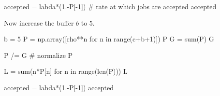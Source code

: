 \begin{exercise}
\begin{solution}
\begin{pyconsole}
accepted = labda*(1.-P[-1]) # rate at which jobs are accepted
accepted
\end{pyconsole}  

Now increase the buffer $b$ to 5.

\begin{pyconsole}
b = 5
P = np.array([rho**n for n in range(c+b+1)])
P
G = sum(P)
G

P /= G # normalize
P

L = sum(n*P[n] for n in range(len(P)))
L

accepted = labda*(1.-P[-1])
accepted
\end{pyconsole}      
    \end{solution}
\end{exercise}

\begin{comment}
\begin{exercise}[use=false]
  The code is in \pyv{progs/mm1\_waiting\_time_distribution.py}. In
this program we compute the waiting time
  distribution. At this point in the text this distribution has not
  yet been derived.  This problem should be moved to another section.

Consider an $M/M/1$ queue with $\mu=1.2$ per hour. Make plots of the
waiting time distribution $\P{W_Q\leq t}$ for various values of
$\lambda$ to show the dependency on the arrival rate. Compare this to
the dependence of average waiting time $\E{W_Q}$ on $\lambda$.

The idea of making such plots is to analyze
  whether the service capacity suffices for a situation in which one
  doesn't know the arrival rate very accurately, but one can control
  the service rate, e.g., by hiring personnel.
  \begin{solution}
    Let's just plot the waiting time distribution
for various values of $\lambda$. 


\begin{figure}[ht]
  \centering
\texttt{[image: progs/mm1\_waiting\_time.tex]}
  \caption{The waiting time distribution for various values of the arrival rate.}
  \label{fig:waitingtime}
\end{figure}


\end{solution}

\end{exercise}
\end{comment}


